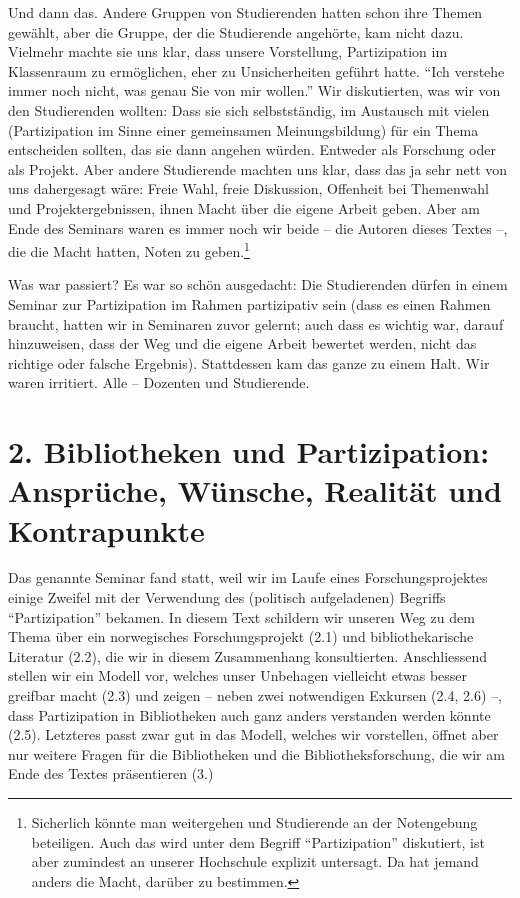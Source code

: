 \documentclass[a4paper,
fontsize=11pt,
oneside,
numbers=noperiodatend,
parskip=half-,
bibliography=totoc,
final
]{scrartcl}
\begin{document}
Und dann das. Andere Gruppen von Studierenden hatten schon ihre Themen
gewählt, aber die Gruppe, der die Studierende angehörte, kam nicht dazu.
Vielmehr machte sie uns klar, dass unsere Vorstellung, Partizipation im
Klassenraum zu ermöglichen, eher zu Unsicherheiten geführt hatte.
\enquote{Ich verstehe immer noch nicht, was genau Sie von mir wollen.}
Wir diskutierten, was wir von den Studierenden wollten: Dass sie sich
selbstständig, im Austausch mit vielen (Partizipation im Sinne einer
gemeinsamen Meinungsbildung) für ein Thema entscheiden sollten, das sie
dann angehen würden. Entweder als Forschung oder als Projekt. Aber
andere Studierende machten uns klar, dass das ja sehr nett von uns
dahergesagt wäre: Freie Wahl, freie Diskussion, Offenheit bei Themenwahl
und Projektergebnissen, ihnen Macht über die eigene Arbeit geben. Aber
am Ende des Seminars waren es immer noch wir beide -- die Autoren dieses
Textes --, die die Macht hatten, Noten zu geben.\footnote{Sicherlich
  könnte man weitergehen und Studierende an der Notengebung beteiligen.
  Auch das wird unter dem Begriff \enquote{Partizipation} diskutiert,
  ist aber zumindest an unserer Hochschule explizit untersagt. Da hat
  jemand anders die Macht, darüber zu bestimmen.}

Was war passiert? Es war so schön ausgedacht: Die Studierenden dürfen in
einem Seminar zur Partizipation im Rahmen partizipativ sein (dass es
einen Rahmen braucht, hatten wir in Seminaren zuvor gelernt; auch dass
es wichtig war, darauf hinzuweisen, dass der Weg und die eigene Arbeit
bewertet werden, nicht das richtige oder falsche Ergebnis). Stattdessen
kam das ganze zu einem Halt. Wir waren irritiert. Alle -- Dozenten und
Studierende.

\section{2. Bibliotheken und Partizipation: Ansprüche, Wünsche, Realität
und
Kontrapunkte}\label{bibliotheken-und-partizipation-anspruxfcche-wuxfcnsche-realituxe4t-und-kontrapunkte}

Das genannte Seminar fand statt, weil wir im Laufe eines
Forschungsprojektes einige Zweifel mit der Verwendung des (politisch
aufgeladenen) Begriffs \enquote{Partizipation} bekamen. In diesem Text
schildern wir unseren Weg zu dem Thema über ein norwegisches
Forschungsprojekt (2.1) und bibliothekarische Literatur (2.2), die wir
in diesem Zusammenhang konsultierten. Anschliessend stellen wir ein
Modell vor, welches unser Unbehagen vielleicht etwas besser greifbar
macht (2.3) und zeigen -- neben zwei notwendigen Exkursen (2.4, 2.6) --,
dass Partizipation in Bibliotheken auch ganz anders verstanden werden
könnte (2.5). Letzteres passt zwar gut in das Modell, welches wir
vorstellen, öffnet aber nur weitere Fragen für die Bibliotheken und die
Bibliotheksforschung, die wir am Ende des Textes präsentieren (3.)
\end{document}
